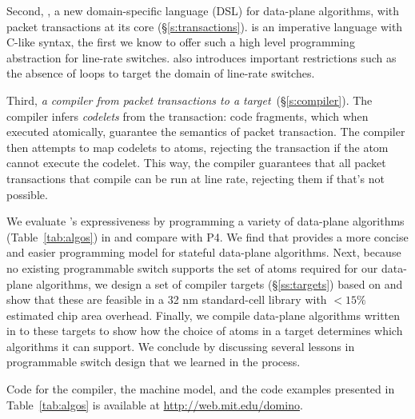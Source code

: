 Second, {\em \pktlanguage{}}, a new domain-specific language (DSL) for
data-plane algorithms, with packet transactions at its core
(\S\ref{s:transactions}).  \pktlanguage is an imperative language with C-like
syntax, the first we know to offer such a high level programming abstraction
for line-rate switches. \pktlanguage also introduces important restrictions
such as the absence of loops to target the domain of line-rate switches.

Third, {\em a compiler from \pktlanguage packet transactions to a \absmachine
target}~(\S\ref{s:compiler}). The \pktlanguage compiler infers {\em codelets}
from the transaction: code fragments, which when executed atomically, guarantee
the semantics of packet transaction. The compiler then attempts to map codelets
to atoms, rejecting the transaction if the atom cannot execute the codelet.
This way, the compiler guarantees that all packet transactions that compile can
be run at line rate, rejecting them if that's not possible.

We evaluate \pktlanguage's expressiveness by programming a variety of
data-plane algorithms (Table~\ref{tab:algos}) in \pktlanguage and compare with
P4. We find that \pktlanguage provides a more concise and easier programming
model for stateful data-plane algorithms.  Next, because no existing
programmable switch supports the set of atoms required for our data-plane
algorithms, we design a set of compiler targets (\S\ref{ss:targets}) based on
\absmachine and show that these are feasible in a 32 nm standard-cell library
with $< 15\%$ estimated chip area overhead. Finally, we compile data-plane
algorithms written in \pktlanguage to these targets to show how the choice of
atoms in a target determines which algorithms it can support. We conclude by
discussing several lessons in programmable switch design that we learned in the
process.

Code for the \pktlanguage compiler, the \absmachine machine model, and the code
examples presented in Table~\ref{tab:algos} is available at
\url{http://web.mit.edu/domino}.
